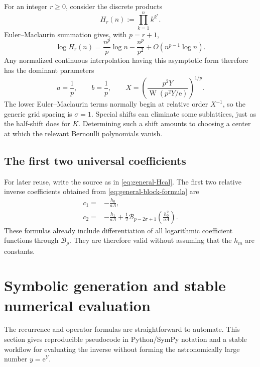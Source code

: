 \documentclass[11pt,oneside]{article}
\theoremstyle{plain}
\theoremstyle{definition}
\theoremstyle{remark}
\newcommand{\W}{\operatorname{W}}
\newcommand{\e}{\mathrm{e}}
\newcommand{\Bcal}{\mathcal{B}}
\begin{document}
For an integer \(r\ge0\), consider the discrete products
\begin{equation}
 H_r(n):=\prod_{k=1}^{n}k^{k^r}.
 \label{eq:Hr-discrete}
\end{equation}
Euler--Maclaurin summation gives, with \(p=r+1\),
\begin{equation}
 \log H_r(n)
 =\frac{n^p}{p}\log n-\frac{n^p}{p^2}
  +O(n^{p-1}\log n).
 \label{eq:Hr-leading}
\end{equation}
Any normalized continuous interpolation having this asymptotic form therefore
has the dominant parameters
\begin{equation}
 a=\frac1p,
 \qquad b=\frac1p,
 \qquad
 X=\left(
 \frac{p^2Y}{\W(p^2Y/\e)}
 \right)^{1/p}.
 \label{eq:Hr-anchor}
\end{equation}
The lower Euler--Maclaurin terms normally begin at relative order \(X^{-1}\),
so the generic grid spacing is \(\sigma=1\).  Special shifts can eliminate
some sublattices, just as the half-shift does for \(K\).  Determining such a
shift amounts to choosing a center at which the relevant Bernoulli
polynomials vanish.

\subsection{The first two universal coefficients}

For later reuse, write the source as in \cref{eq:general-Hcal}.  The first two
relative inverse coefficients obtained from
\cref{eq:general-block-formula} are
\begin{align}
 c_1={}&-\frac{h_0}{a\Lambda},
 \label{eq:general-c1}\\
 c_2={}&-\frac{h_1}{a\Lambda}
 +\frac12\Bcal_{p-2\sigma+1}
 \left(\frac{h_0^2}{a\Lambda}\right).
 \label{eq:general-c2}
\end{align}
These formulas already include differentiation of all logarithmic coefficient
functions through \(\Bcal_\rho\).  They are therefore valid without assuming
that the \(h_m\) are constants.

\section{Symbolic generation and stable numerical evaluation}
\label{sec:algorithms}

The recurrence and operator formulas are straightforward to automate.  This
section gives reproducible pseudocode in Python/SymPy notation and a stable
workflow for evaluating the inverse without forming the astronomically large
number \(y=\e^Y\).
\end{document}
